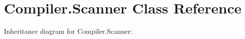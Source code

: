 \hypertarget{class_compiler_1_1_scanner}{}\section{Compiler.\+Scanner Class Reference}
\label{class_compiler_1_1_scanner}


Inheritance diagram for Compiler.\+Scanner\+:
